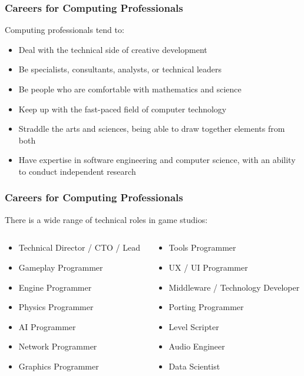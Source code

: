\begin{frame}
	\frametitle{Careers for Computing Professionals}
	
	Computing professionals tend to:
	
	\begin{itemize}
		\item Deal with the technical side of creative development \pause
		\item Be specialists, consultants, analysts, or technical leaders \pause
		\item Be people who are comfortable with mathematics and science \pause
		\item Keep up with the fast-paced field of computer technology \pause
		\item Straddle the arts and sciences, being able to draw together elements from both \pause
		\item Have expertise in software engineering and computer science, with an ability to conduct independent research
	\end{itemize}
\end{frame}

\begin{frame}
	\frametitle{Careers for Computing Professionals}
	
	There is a wide range of technical roles in game studios:
	
	\begin{columns}
		\begin{column}{0.5\textwidth}
			\begin{itemize}
				\item Technical Director / CTO / Lead
				\item Gameplay Programmer
				\item Engine Programmer
				\item Physics Programmer
				\item AI Programmer
				\item Network Programmer
				\item Graphics Programmer
			\end{itemize}
		\end{column}
		\begin{column}{0.5\textwidth}
			\begin{itemize}
				\item Tools Programmer
				\item UX / UI Programmer
				\item Middleware / Technology Developer
				\item Porting Programmer
				\item Level Scripter
				\item Audio Engineer
				\item Data Scientist
			\end{itemize}
		\end{column}
	\end{columns}
\end{frame}

